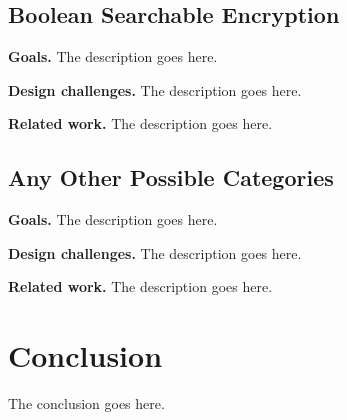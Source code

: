 \documentclass[conference]{IEEEtran}
\begin{document}
\subsection{Boolean Searchable Encryption}

\textbf{Goals.} The description goes here.


\textbf{Design challenges.} The description goes here.

\textbf{Related work.} The description goes here.

\subsection{Any Other Possible Categories}

\textbf{Goals.} The description goes here.


\textbf{Design challenges.} The description goes here.

\textbf{Related work.} The description goes here.

\section{Conclusion}

The conclusion goes here.




\end{document}
